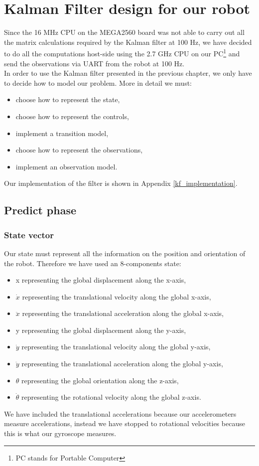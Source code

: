 \chapter{Kalman Filter design for our robot}
Since the 16 MHz CPU on the MEGA2560 board was not able to carry out all the matrix calculations required by the Kalman filter at 100 Hz, we have decided to do all the computations host-side using the 2.7 GHz CPU on our PC\footnote{PC stands for Portable Computer} and send the observations via UART from the robot at 100 Hz.\\

In order to use the Kalman filter presented in the previous chapter, we only have to decide how to model our problem. More in detail we must:
\begin{itemize}
	\item choose how to represent the state,
	\item choose how to represent the controls,
	\item implement a transition model,
	\item choose how to represent the observations,
	\item implement an observation model.
\end{itemize}

Our implementation of the filter is shown in Appendix \ref{kf_implementation}.

\section{Predict phase}

\subsection{State vector}\label{state}
Our state must represent all the information on the position and orientation of the robot. Therefore we have used an 8-components state:
\begin{itemize}
	\item x representing the global displacement along the x-axis,
	\item $\dot{x}$ representing the translational velocity along the global x-axis,
	\item $\ddot{x}$ representing the translational acceleration along the global x-axis,
	\item y representing the global displacement along the y-axis,
	\item $\dot{y}$ representing the translational velocity along the global y-axis,
	\item $\ddot{y}$ representing the translational acceleration along the global y-axis,
	\item $\theta$ representing the global orientation along the z-axis,
	\item $\dot{\theta}$ representing the rotational velocity along the global z-axis.
\end{itemize}
We have included the translational accelerations because our accelerometers measure accelerations, instead we have stopped to rotational velocities because this is what our gyroscope measures.\\

